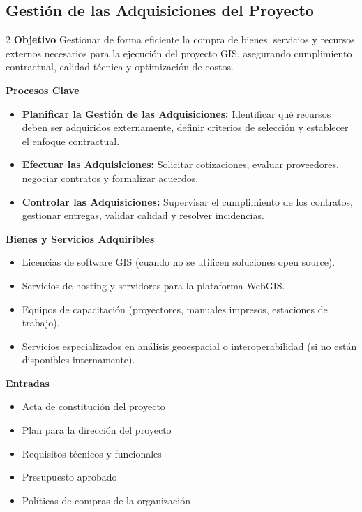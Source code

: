   \subsection{Gestión de las Adquisiciones del Proyecto}

\begin{multicols}{2}
  \textbf{Objetivo}
Gestionar de forma eficiente la compra de bienes, servicios y recursos externos necesarios para la ejecución del proyecto GIS, asegurando cumplimiento contractual, calidad técnica y optimización de costos.

\textbf{Procesos Clave}
\begin{itemize}
    \item \textbf{Planificar la Gestión de las Adquisiciones:} Identificar qué recursos deben ser adquiridos externamente, definir criterios de selección y establecer el enfoque contractual.
    \item \textbf{Efectuar las Adquisiciones:} Solicitar cotizaciones, evaluar proveedores, negociar contratos y formalizar acuerdos.
    \item \textbf{Controlar las Adquisiciones:} Supervisar el cumplimiento de los contratos, gestionar entregas, validar calidad y resolver incidencias.
\end{itemize}

\textbf{Bienes y Servicios Adquiribles}
\begin{itemize}
    \item Licencias de software GIS (cuando no se utilicen soluciones open source).
    \item Servicios de hosting y servidores para la plataforma WebGIS.
    \item Equipos de capacitación (proyectores, manuales impresos, estaciones de trabajo).
    \item Servicios especializados en análisis geoespacial o interoperabilidad (si no están disponibles internamente).
\end{itemize}

\textbf{Entradas}
\begin{itemize}
    \item Acta de constitución del proyecto
    \item Plan para la dirección del proyecto
    \item Requisitos técnicos y funcionales
    \item Presupuesto aprobado
    \item Políticas de compras de la organización
\end{itemize}


\end{multicols}
